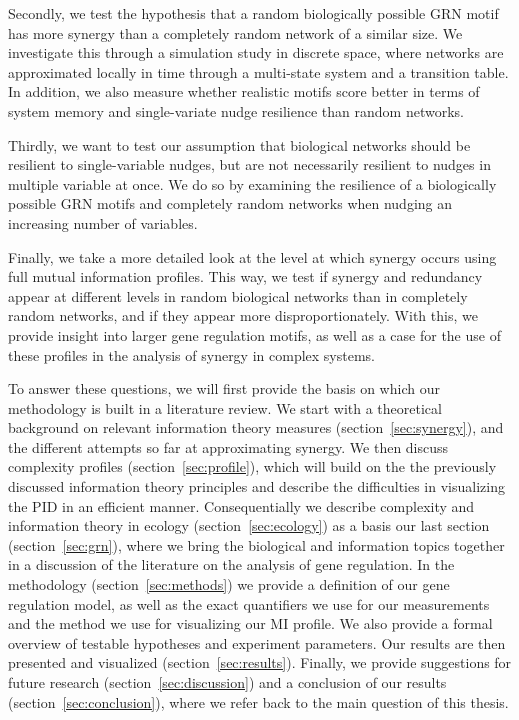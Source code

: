 \documentclass[../main.tex]{subfiles}
\begin{document}
Secondly, we test the hypothesis that a random biologically possible GRN motif has more synergy than a completely random network of a similar size.
We investigate this through a simulation study in discrete space, where networks are approximated locally in time through a multi-state system and a transition table.
In addition, we also measure whether realistic motifs score better in terms of system memory and single-variate nudge resilience than random networks. %

Thirdly, we want to test our assumption that biological networks should be resilient to single-variable nudges, but are not necessarily resilient to nudges in multiple variable at once.
We do so by examining the resilience of a biologically possible GRN motifs and completely random networks when nudging an increasing number of variables.

Finally, we take a more detailed look at the level at which synergy occurs using full mutual information profiles.
This way, we test if synergy and redundancy appear at different levels in random biological networks than in completely random networks, and if they appear more disproportionately.
With this, we provide insight into larger gene regulation motifs, as well as a case for the use of these profiles in the analysis of synergy in complex systems.

To answer these questions, we will first provide the basis on which our methodology is built in a literature review.
We start with a theoretical background on relevant information theory measures (section~\ref{sec:synergy}), and the different attempts so far at approximating synergy.
We then discuss complexity profiles (section~\ref{sec:profile}), which will build on the the previously discussed information theory principles and describe the difficulties in visualizing the PID in an efficient manner.
Consequentially we describe complexity and information theory in ecology (section~\ref{sec:ecology}) as a basis our last section (section~\ref{sec:grn}), where we bring the biological and information topics together in a discussion of the literature on the analysis of gene regulation.
In the methodology (section~\ref{sec:methods}) we provide a definition of our gene regulation model, as well as the exact quantifiers we use for our measurements and the method we use for visualizing our MI profile.
We also provide a formal overview of testable hypotheses and experiment parameters.
Our results are then presented and visualized (section~\ref{sec:results}).
Finally, we provide suggestions for future research (section~\ref{sec:discussion}) and a conclusion of our results (section~\ref{sec:conclusion}), where we refer back to the main question of this thesis.
\end{document}
